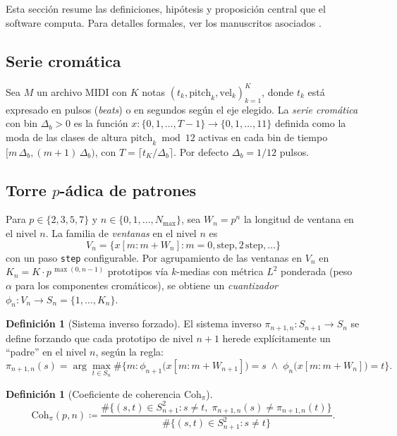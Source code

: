 \documentclass[11pt,a4paper,oneside]{article}
\theoremstyle{plain}
\theoremstyle{definition}
\newtheorem{definition}[theorem]{Definición}
\theoremstyle{remark}
\newcommand{\Cohpi}{\mathrm{Coh}_\pi}
\newcommand{\code}[1]{\texttt{\small #1}}
\begin{document}
Esta sección resume las definiciones, hipótesis y proposición central
que el software computa. Para detalles formales, ver los manuscritos
asociados \cite{paper1,paper2}.

\subsection{Serie cromática}

Sea $M$ un archivo MIDI con $K$ notas $(t_k, \mathrm{pitch}_k,
\mathrm{vel}_k)_{k=1}^{K}$, donde $t_k$ está expresado en pulsos
(\emph{beats}) o en segundos según el eje elegido. La
\emph{serie cromática} con bin $\Delta_b > 0$ es la función
$x\colon \{0, 1, \ldots, T-1\} \to \{0, 1, \ldots, 11\}$ definida como
la moda de las clases de altura $\mathrm{pitch}_k \bmod 12$ activas en
cada bin de tiempo $[m\,\Delta_b, (m+1)\,\Delta_b)$, con $T =
\lceil t_K / \Delta_b \rceil$. Por defecto $\Delta_b = 1/12$ pulsos.

\subsection{Torre $p$-ádica de patrones}

Para $p \in \{2,3,5,7\}$ y $n \in \{0, 1, \ldots, N_{\max}\}$, sea
$W_n = p^n$ la longitud de ventana en el nivel $n$. La familia de
\emph{ventanas} en el nivel $n$ es
\[
  V_n = \{ x[m : m+W_n] : m = 0, \mathrm{step}, 2\,\mathrm{step}, \ldots\}
\]
con un paso \code{step} configurable. Por agrupamiento de las ventanas
en $V_n$ en $K_n = K \cdot p^{\,\max(0, n-1)}$ prototipos vía $k$-medias
con métrica $L^2$ ponderada (peso $\alpha$ para los componentes
cromáticos), se obtiene un \emph{cuantizador}
$\phi_n\colon V_n \to S_n = \{1, \ldots, K_n\}$.

\begin{definition}[Sistema inverso forzado]
El sistema inverso $\pi_{n+1,n}\colon S_{n+1} \to S_n$ se define
forzando que cada prototipo de nivel $n+1$ herede explícitamente un
``padre'' en el nivel $n$, según la regla:
\[
  \pi_{n+1,n}(s)
  =
  \arg\max_{t \in S_n}
    \#\{m : \phi_{n+1}\bigl(x[m:m+W_{n+1}]\bigr) = s
                  \;\wedge\;
                  \phi_{n}\bigl(x[m:m+W_n]\bigr) = t\}.
\]
\end{definition}

\begin{definition}[Coeficiente de coherencia $\Cohpi$]
\[
  \Cohpi(p,n)
  \coloneqq
  \frac{
    \#\{ (s,t) \in S_{n+1}^2 :
         s \neq t,\;
         \pi_{n+1,n}(s) \neq \pi_{n+1,n}(t)\}
  }{
    \#\{ (s,t) \in S_{n+1}^2 : s \neq t\}
  }.
\]
\end{definition}
\end{document}
